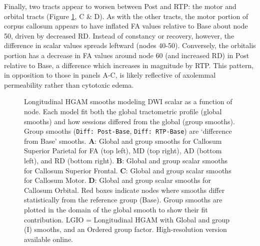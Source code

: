 \documentclass[12pt]{article}
\begin{document}
Finally, two tracts appear to worsen between Post and RTP: the motor and orbital tracts (Figure \ref{fig:lgio-gam-cc}, C \& D). As with the other tracts, the motor portion of corpus callosum appears to have inflated FA values relative to Base about node 50, driven by decreased RD. Instead of constancy or recovery, however, the difference in scalar values spreads leftward (nodes 40-50). Conversely, the orbitalis portion has a decrease in FA values around node 60 (and increased RD) in Post relative to Base, a difference which increases in magnitude by RTP. This pattern, in opposition to those in panels A-C, is likely reflective of axolemmal permeability rather than cytotoxic edema.

\begin{figure}[H]
	\centering
	\caption{Longitudinal HGAM smooths modeling DWI scalar as a function of node. Each model fit both the global tractometric profile (global smooths) and how sessions differed from the global (group smooths). Group smooths (\lstinline{Diff: Post-Base}, \lstinline{Diff: RTP-Base}) are `difference from Base' smooths. \textbf{A}: Global and group smooths for Callosum Superior Parietal for FA (top left), MD (top right), AD (bottom left), and RD (bottom right). \textbf{B}: Global and group scalar smooths for Callosum Superior Frontal. \textbf{C}: Global and group scalar smooths for Callosum Motor. \textbf{D}: Global and group scalar smooths for Callosum Orbital. Red boxes indicate nodes where smooths differ statistically from the reference group (Base). Group smooths are plotted in the domain of the global smooth to show their fit contribution. LGIO = Longitudinal HGAM with Global and group (I) smooths, and an Ordered group factor. High-resolution version available online.}
	\label{fig:lgio-gam-cc}
\end{figure}
\end{document}
